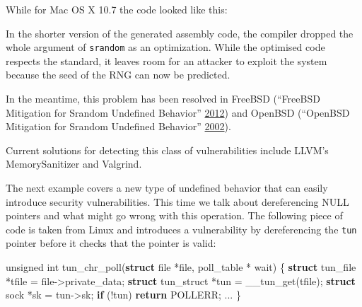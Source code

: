 \documentclass[a4paper,]{report}
\newenvironment{Shaded}{}{}
\newcommand{\BaseNTok}[1]{\textcolor[rgb]{0.25,0.63,0.44}{#1}}
\newcommand{\CommentTok}[1]{\textcolor[rgb]{0.38,0.63,0.69}{\textit{#1}}}
\newcommand{\ControlFlowTok}[1]{\textcolor[rgb]{0.00,0.44,0.13}{\textbf{#1}}}
\newcommand{\DataTypeTok}[1]{\textcolor[rgb]{0.56,0.13,0.00}{#1}}
\newcommand{\KeywordTok}[1]{\textcolor[rgb]{0.00,0.44,0.13}{\textbf{#1}}}
\newcommand{\NormalTok}[1]{#1}
\begin{document}
While for Mac OS X 10.7 the code looked like this:

\begin{Shaded}
\end{Shaded}

In the shorter version of the generated assembly code, the compiler
dropped the whole argument of \texttt{srandom} as an optimization. While
the optimised code respects the standard, it leaves room for an attacker
to exploit the system because the seed of the RNG can now be predicted.

In the meantime, this problem has been resolved in FreeBSD (``FreeBSD
Mitigation for Srandom Undefined Behavior''
\protect\hyperlink{ref-FbsdJunk}{2012}) and OpenBSD (``OpenBSD
Mitigation for Srandom Undefined Behavior''
\protect\hyperlink{ref-ObsdJunk}{2002}).

Current solutions for detecting this class of vulnerabilities include
LLVM's MemorySanitizer and Valgrind.

The next example covers a new type of undefined behavior that can easily
introduce security vulnerabilities. This time we talk about
dereferencing NULL pointers and what might go wrong with this operation.
The following piece of code is taken from Linux and introduces a
vulnerability by dereferencing the \texttt{tun} pointer before it checks
that the pointer is valid:

\begin{Shaded}
\begin{Highlighting}[]
\DataTypeTok{unsigned} \DataTypeTok{int}
\NormalTok{tun_chr_poll(}\KeywordTok{struct}\NormalTok{ file *file, poll_table * wait)}
\NormalTok{\{}
  \KeywordTok{struct}\NormalTok{ tun_file *tfile = file->private_data;}
  \KeywordTok{struct}\NormalTok{ tun_struct *tun = __tun_get(tfile);}
  \KeywordTok{struct}\NormalTok{ sock *sk = tun->sk;}
  \ControlFlowTok{if}\NormalTok{ (!tun)}
    \ControlFlowTok{return}\NormalTok{ POLLERR;}
\NormalTok{  ...}
\NormalTok{\}}
\end{Highlighting}
\end{Shaded}
\end{document}
